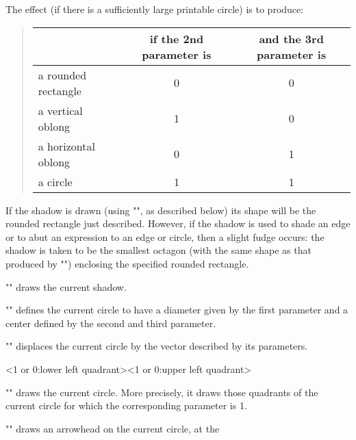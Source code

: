 \documentclass[11pt]{article}
\begin{document}
The effect (if there is a sufficiently large printable circle) is to produce:
\begin{verse}
\begin{tabular}{lcc}
     &  if the 2nd parameter is & and the 3rd parameter is\\
\hline 
    a rounded rectangle    &                                     0& 0 \\
    a vertical oblong      &                                     1& 0 \\
    a horizontal oblong    &                                     0& 1 \\
    a circle               &                                     1& 1

\end{tabular}
\end{verse}
If the shadow is drawn (using "\outline", as described below) its shape will
be the rounded rectangle just described.  However, if the shadow is used
to shade an edge or to abut an expression to an edge or circle, then a
slight fudge occurs: the shadow is taken to be the smallest octagon
(with the same shape as that produced by "\octagon") enclosing the specified
rounded rectangle.
\begin{myverb}
    \outline
\end{myverb}
"\outline" draws the current shadow.
\begin{myverb}
\end{myverb}
"\setcircle" defines the current circle to have a diameter given by the first
parameter and a center defined by the second and third parameter.
\begin{myverb}
\end{myverb}
"\shiftcircle" displaces the current circle by the vector described by its
parameters.
\begin{myverb}
        <1 or 0:lower left quadrant><1 or 0:upper left quadrant>
\end{myverb}
"\drawcircle" draws the current circle.  More precisely, it draws those
quadrants of the current circle for which the corresponding parameter is 1.
\begin{myverb}
\end{myverb}
"\drawcirclehead" draws an arrowhead on the current circle, at the
\end{document}
